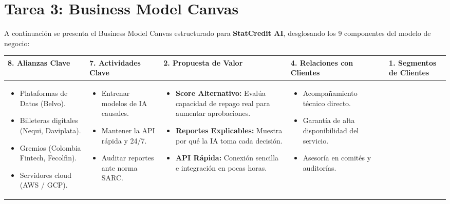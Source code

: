 \documentclass[11pt,a4paper]{article}
\begin{document}
\newpage
\section{Tarea 3: Business Model Canvas}

A continuación se presenta el Business Model Canvas estructurado para \textbf{StatCredit AI}, desglosando los 9 componentes del modelo de negocio:

\begin{table}[h!]
\centering
\small
\begin{tabularx}{\linewidth}{|X|X|X|X|X|}
\hline
\rowcolor{lightgray}
\textbf{8. Alianzas Clave} & 
\textbf{7. Actividades Clave} & 
\textbf{2. Propuesta de Valor} & 
\textbf{4. Relaciones con Clientes} & 
\textbf{1. Segmentos de Clientes} \\ 
\hline
\begin{itemize}[leftmargin=*]
    \item Plataformas de Datos (Belvo).
    \item Billeteras digitales (Nequi, Daviplata).
    \item Gremios (Colombia Fintech, Fecolfin).
    \item Servidores cloud (AWS / GCP).
\end{itemize} & 
\begin{itemize}[leftmargin=*]
    \item Entrenar modelos de IA causales.
    \item Mantener la API rápida y 24/7.
    \item Auditar reportes ante norma SARC.
\end{itemize} & 
\begin{itemize}[leftmargin=*]
    \item \textbf{Score Alternativo:} Evalúa capacidad de repago real para aumentar aprobaciones.
    \item \textbf{Reportes Explicables:} Muestra por qué la IA toma cada decisión.
    \item \textbf{API Rápida:} Conexión sencilla e integración en pocas horas.
\end{itemize} & 
\begin{itemize}[leftmargin=*]
    \item Acompañamiento técnico directo.
    \item Garantía de alta disponibilidad del servicio.
    \item Asesoría en comités y auditorías.

\end{itemize}
\end{tabularx}
\end{table}
\end{document}

